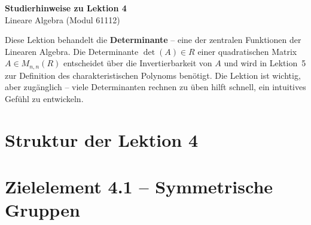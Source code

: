 \documentclass[a4paper,12pt]{article}
\begin{document}
\begin{center}
  {\LARGE\bfseries Studierhinweise zu Lektion 4}\\[0.5em]
  {\large Lineare Algebra (Modul 61112)}
\end{center}

\vspace{0.8em}

Diese Lektion behandelt die \textbf{Determinante} -- eine der zentralen Funktionen der Linearen Algebra.
Die Determinante $\det(A) \in R$ einer quadratischen Matrix $A \in M_{n,n}(R)$ entscheidet über die
Invertierbarkeit von $A$ und wird in Lektion~5 zur Definition des charakteristischen Polynoms
benötigt. Die Lektion ist wichtig, aber zugänglich -- viele Determinanten rechnen zu üben hilft
schnell, ein intuitives Gefühl zu entwickeln.

\section*{Struktur der Lektion 4}

\begin{center}
\end{center}

\newpage

\section*{Zielelement 4.1 -- Symmetrische Gruppen}
\end{document}
